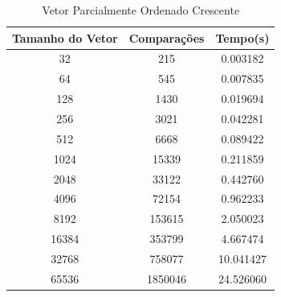 \documentclass[12pt,a4paper,twoside]{report}
\begin{document}
\begin{table}[h]
  \centering
  \caption{Vetor Parcialmente Ordenado Crescente \label{tab:poc}}
  \begin{tabular}{ccc} \\\hline
  \textbf{Tamanho do Vetor} & \textbf{Comparações} & \textbf{Tempo(s)} \\\hline
  32                        & 215                  & 0.003182          \\\hline
  64                        & 545                 & 0.007835          \\\hline
  128                       & 1430                 & 0.019694          \\\hline
  256                       & 3021                & 0.042281          \\\hline
  512                       & 6668               & 0.089422          \\\hline
  1024                      & 15339               & 0.211859          \\\hline
  2048                      & 33122              & 0.442760          \\\hline
  4096                      & 72154              & 0.962233        \\\hline
  8192                      & 153615             & 2.050023			\\\hline
  16384                     & 353799            & 4.667474        \\\hline
  32768                     & 758077            & 10.041427        \\\hline
  65536                     & 1850046            & 24.526060        \\\hline
  \end{tabular}
\end{table}
\end{document}
